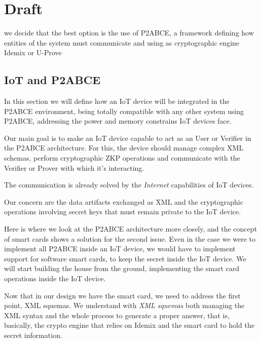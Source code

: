 \chapter{Draft}\label{ch:draft}


we decide that the best option is the use of P2ABCE, a framework defining how entities of the system must communicate and using as cryptographic engine Idemix or U-Prove





\section{IoT and P2ABCE}

In this section we will define how an IoT device will be integrated in the P2ABCE environment, being totally compatible with any other system using P2ABCE, addressing the power and memory constrains IoT devices face.


\hfil

Our main goal is to make an IoT device capable to act as an User or Verifier in the P2ABCE architecture. For this, the device should manage complex XML schemas, perform cryptographic ZKP operations and communicate with the Verifier or Prover with which it's interacting.

The communication is already solved by the \textit{Internet} capabilities of IoT devices.

Our concern are the data artifacts exchanged as XML and the cryptographic operations involving secret keys that must remain private to the IoT device.

Here is where we look at the P2ABCE architecture more closely, and the concept of smart cards shows a solution for the second issue. Even in the case we were to implement all P2ABCE inside an IoT device, we would have to implement support for software smart cards, to keep the secret inside the IoT device. We will start building the house from the ground, implementing the smart card operations inside the IoT device.

Now that in our design we have the smart card, we need to address the first point, XML squemas. We understand with \textit{XML squemas} both managing the XML syntax and the whole process to generate a proper answer, that is, basically, the crypto engine that relies on Idemix and the smart card to hold the secret information.


